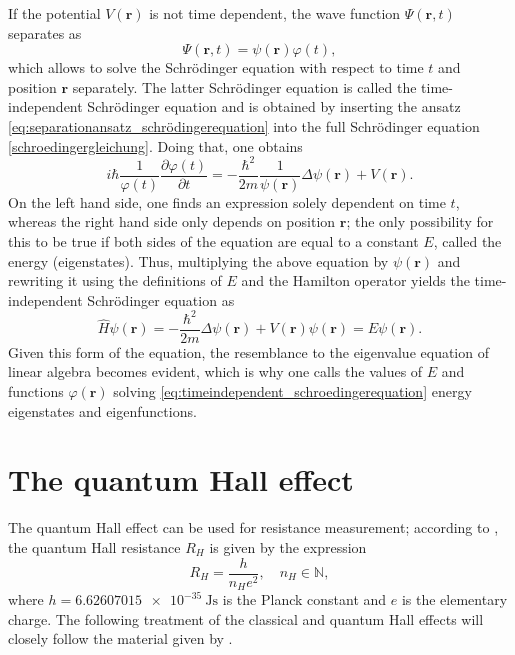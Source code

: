 \documentclass{report}
\numberwithin{tm}{section}
\newcommand\vect[1]{\ensuremath{\bm{#1}}}
\begin{document}
	
	If the potential $V(\vect{r})$ is not time dependent, the wave function $\Psi(\vect{r},t)$ separates as \begin{equation}\label{eq:separationansatz_schrödingerequation}\Psi(\vect{r},t) = \psi(\vect{r})\varphi(t),\end{equation} which allows to solve the Schrödinger equation with respect to time $t$ and position $\vect{r}$ separately. The latter Schrödinger equation is called the time-independent Schrödinger equation and is obtained by inserting the ansatz \cref{eq:separationansatz_schrödingerequation} into the full Schrödinger equation \cref{schroedingergleichung}. Doing that, one obtains \begin{equation}
		i\hbar \frac{1}{\varphi(t)}\frac{\partial \varphi(t)}{\partial t} = -\frac{\hbar^2}{2m}\frac{1}{\psi(\vect{r})}\Delta \psi(\vect{r}) + V(\vect{r}).
	\end{equation} On the left hand side, one finds an expression solely dependent on time $t$, whereas the right hand side only depends on position $\vect{r}$; the only possibility for this to be true if both sides of the equation are equal to a constant $E$, called the energy (eigenstates). Thus, multiplying the above equation by $\psi(\vect{r})$ and rewriting it using the definitions of $E$ and the Hamilton operator yields the time-independent Schrödinger equation as \begin{equation}
	\label{eq:timeindependent_schroedingerequation}
	\hat{H}\psi(\vect{r}) = -\frac{\hbar^2}{2m}\Delta \psi(\vect{r}) + V(\vect{r})\psi(\vect{r}) = E\psi(\vect{r}).
	\end{equation} Given this form of the equation, the resemblance to the eigenvalue equation of linear algebra becomes evident, which is why one calls the values of $E$ and functions $\varphi(\vect{r})$ solving \cref{eq:timeindependent_schroedingerequation} energy eigenstates and eigenfunctions.
	
	  
	\section{The quantum Hall effect}
	The quantum Hall effect can be used for resistance measurement; according to \cite{B_Jeckelmann_2001}, the quantum Hall resistance $R_H$ is given by the expression \begin{equation}\label{eq:quantumhalleffect}
		R_H = \frac{h}{n_He^2}, \quad n_H \in \mathbb{N},
	\end{equation} where $h = \SI{6.62607015e-35}{\joule\second}$ is the Planck constant and $e$ is the elementary charge. The following treatment of the classical and quantum Hall effects will closely follow the material given by \cite{tong2016lectures}.
	
\end{document}
